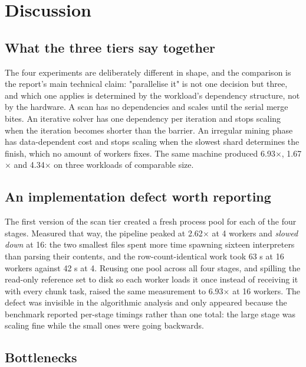 
\section{Discussion}

\subsection{What the three tiers say together}

The four experiments are deliberately different in shape, and the comparison is the report's main technical claim: "parallelise it" is not one decision but three, and which one applies is determined by the workload's dependency structure, not by the hardware. A scan has no dependencies and scales until the serial merge bites. An iterative solver has one dependency per iteration and stops scaling when the iteration becomes shorter than the barrier. An irregular mining phase has data-dependent cost and stops scaling when the slowest shard determines the finish, which no amount of workers fixes. The same machine produced 6.93$\times$, 1.67$\times$ and 4.34$\times$ on three workloads of comparable size.

\subsection{An implementation defect worth reporting}

The first version of the scan tier created a fresh process pool for each of the four stages. Measured that way, the pipeline peaked at 2.62$\times$ at 4 workers and \emph{slowed down} at 16: the two smallest files spent more time spawning sixteen interpreters than parsing their contents, and the row-count-identical work took 63 s at 16 workers against 42 s at 4. Reusing one pool across all four stages, and spilling the read-only reference set to disk so each worker loads it once instead of receiving it with every chunk task, raised the same measurement to 6.93$\times$ at 16 workers. The defect was invisible in the algorithmic analysis and only appeared because the benchmark reported per-stage timings rather than one total: the large stage was scaling fine while the small ones were going backwards.

\subsection{Bottlenecks}

